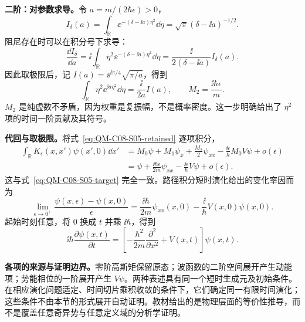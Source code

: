 \textbf{二阶：对参数求导。}令 $a=m/(2\hbar\epsilon)>0$，
\begin{equation}
  I_\delta(a)=\int_{\mathbb R}\ee^{-(\delta-\ii a)\eta^2}\dd\eta
    =\sqrt\pi(\delta-\ii a)^{-1/2}.
\end{equation}
阻尼存在时可以在积分号下求导：
\begin{equation}
  \frac{\dd I_\delta}{\dd a}
    =\ii\int_{\mathbb R}\eta^2\ee^{-(\delta-\ii a)\eta^2}\dd\eta
    =\frac{\ii}{2(\delta-\ii a)}I_\delta(a).
\end{equation}
因此取极限后，记 $I(a)=\ee^{\ii\pi/4}\sqrt{\pi/a}$，得到
\begin{equation}
  \int_{\mathbb R}\eta^2\ee^{\ii a\eta^2}\dd\eta
    =\frac{\ii}{2a}I(a),\qquad
  \boxed{M_2=\frac{\ii\hbar\epsilon}{m}}.
  \label{eq:QM-C08-S05-second-moment}
\end{equation}
$M_2$ 是纯虚数不矛盾，因为权重是复振幅，不是概率密度。这一步明确给出了 $\eta^2$ 项的时间一阶贡献及其符号。

\textbf{代回与取极限。}将式~\eqref{eq:QM-C08-S05-retained} 逐项积分，
\begin{align}
  \int_{\mathbb R}K_\epsilon(x,x')\psi(x',0)\dd x'
    &=M_0\psi+M_1\psi_x+\frac{M_2}{2}\psi_{xx}
      -\frac{\ii\epsilon}{\hbar}M_0V\psi+o(\epsilon)\\
    &=\psi+\frac{\ii\hbar\epsilon}{2m}\psi_{xx}
      -\frac{\ii\epsilon}{\hbar}V\psi+o(\epsilon).
\end{align}
这与式~\eqref{eq:QM-C08-S05-target} 完全一致。路径积分短时演化给出的变化率因而为
\begin{equation}
  \lim_{\epsilon\to0^+}
  \frac{\psi(x,\epsilon)-\psi(x,0)}{\epsilon}
    =\frac{\ii\hbar}{2m}\psi_{xx}(x,0)
      -\frac{\ii}{\hbar}V(x,0)\psi(x,0).
\end{equation}
起始时刻任意，将 $0$ 换成 $t$ 并乘 $\ii\hbar$，得到
\begin{equation}
  \boxed{\ii\hbar\frac{\partial\psi(x,t)}{\partial t}
    =\left[-\frac{\hbar^2}{2m}\frac{\partial^2}{\partial x^2}
      +V(x,t)\right]\psi(x,t)}.
  \label{eq:QM-C08-S05-schrodinger}
\end{equation}

\textbf{各项的来源与证明边界。}零阶高斯矩保留原态；波函数的二阶空间展开产生动能项；势能相位的一阶展开产生 $V\psi$。两种表述具有同一个短时生成元及初始条件。在相应演化问题适定、时间切片乘积收敛的条件下，它们确定同一有限时间演化；这些条件不由本节的形式展开自动证明。教材给出的是物理层面的等价性推导，而不是覆盖任意奇异势与任意定义域的分析学证明。


